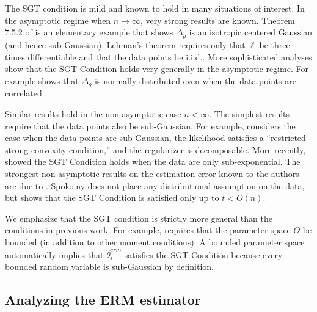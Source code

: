 \documentclass[twoside]{article}
\newcommand{\w}{\theta}
\newcommand{\wmle}{\hat\w^{erm}}
\newcommand{\what}{{\hat\w}}
\newcommand{\loss}{\ell}
\begin{document}
The SGT condition is mild and known to hold in many situations of interest.
In the asymptotic regime when $n\to\infty$,
very strong results are known.
Theorem 7.5.2 of \citet{lehmann1999elements} is an elementary example that shows $\Delta_\what$ is an isotropic centered Gaussian
(and hence sub-Gaussian).
Lehman's theorem requires only that $\loss$ be three times differentiable and that
the data points be i.i.d..
More sophisticated analyses show that the SGT Condition holds very generally in the asymptotic regime.
For example \citet{spokoiny2012parametricestimation} shows that $\Delta_\what$ is normally distributed even when the data points are correlated.

Similar results hold in the non-asymptotic case $n<\infty$.
The simplest results require that the data points also be sub-Gaussian.
For example, \citet{negahban2009unified} considers the case when the data points are sub-Gaussian, the likelihood satisfies a ``restricted strong convexity condition,'' and the regularizer is decomposable.
More recently, \citet{sivakumar2015beyond} showed the SGT Condition holds when the data are only sub-exponential.
The strongest non-asymptotic results on the estimation error known to the authors are due to \citet{spokoiny2012parametricestimation}.
Spokoiny does not place any distributional assumption on the data,
but shows that the SGT Condition is satisfied only up to $t < O(n)$.

We emphasize that the SGT condition is strictly more general than the conditions in previous work.
For example, \citet{zhang2012communication} requires that the parameter space $\Theta$ be bounded (in addition to other moment conditions).
A bounded parameter space automatically implies that $\wmle_i$ satisfies the SGT Condition because every bounded random variable is sub-Gaussian by definition.



\subsection{Analyzing the ERM estimator}
\end{document}
